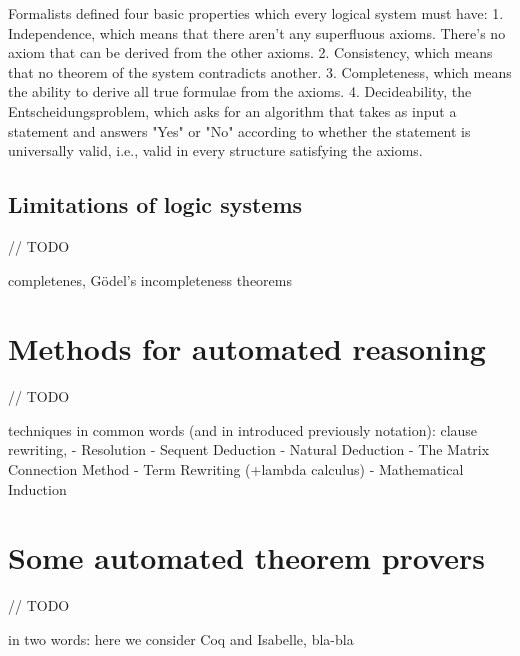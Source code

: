 \documentclass[article]{aaltoseries}
\begin{document}
Formalists defined four basic properties which every logical system must have:
1. Independence, which means that there aren’t any superfluous axioms. There’s no axiom that can be derived from the other axioms.
2. Consistency, which means that no theorem of the system contradicts another.
3. Completeness, which means the ability to derive all true formulae from the axioms.
4. Decideability, the Entscheidungsproblem, which asks for an algorithm that takes as input a statement and answers "Yes" or "No" according to whether the statement is universally valid, i.e., valid in every structure satisfying the axioms.


\subsection{Limitations of logic systems}
\label{sec:limitations}
// TODO

completenes, Gödel's incompleteness theorems



\section{Methods for automated reasoning}
\label{sec:auto_reasoning}
// TODO


techniques in common words (and in introduced previously notation): clause rewriting, 
- Resolution
- Sequent Deduction
- Natural Deduction
- The Matrix Connection Method
- Term Rewriting (+lambda calculus)
- Mathematical Induction




\section{Some automated theorem provers}
\label{sec:provers}
// TODO

in two words: here we consider Coq and Isabelle, bla-bla

\end{document}
